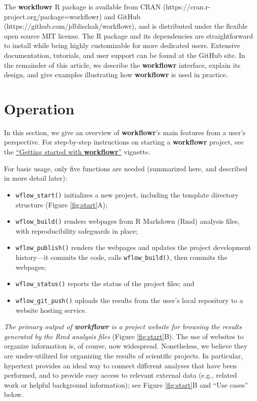 \documentclass[9pt,a4paper]{extarticle}
\begin{document}
The \textbf{workflowr} R package is available from CRAN
(https://cran.r-project.org/package=workflowr) and GitHub
(https://github.com/jdblischak/workflowr), and is distributed under the
flexible open source MIT license. The R package and its dependencies are
straightforward to install while being highly customizable for more
dedicated users. Extensive documentation, tutorials, and user support
can be found at the GitHub site. In the remainder of this article, we
describe the \textbf{workflowr} interface, explain its design, and give examples
illustrating how \textbf{workflowr} is used in practice.


\section*{Operation}

In this section, we give an overview of \textbf{workflowr}'s main features from a
user's perspective. For step-by-step instructions on starting a
 \textbf{workflowr} project, see the
\href{https://jdblischak.github.io/workflowr/articles/wflow-01-getting-started.html}{``Getting
started with \textbf{workflowr}''} vignette.

For basic usage, only five functions are needed (summarized here, and
described in more detail later):

\begin{itemize}

\item \texttt{wflow\_start()} initializes a new project, including the template
directory structure (Figure \ref{fig:start}A);

\item \texttt{wflow\_build()} renders webpages from R Markdown (Rmd) analysis
files, with reproducibility safeguards in place;

\item \texttt{wflow\_publish()} renders the webpages and updates the project
development history—it commits the code, calls \texttt{wflow\_build()}, then
commits the webpages;

\item \texttt{wflow\_status()} reports the status of the project files; and

\item \texttt{wflow\_git\_push()} uploads the results from the user's local
repository to a website hosting service.

\end{itemize}

\textit{The primary output of \textbf{workflowr} is a project website for
browsing the results generated by the Rmd analysis files} (Figure \ref{fig:start}B).
The use of websites to organize information is, of course, now
widespread. Nonetheless, we believe they are under-utilized for
organizing the results of scientific projects. In particular, hypertext
provides an ideal way to connect different analyses that have been
performed, and to provide easy access to relevant external data (e.g.,
related work or helpful background information); see Figure \ref{fig:start}B and ``Use
cases'' below.
\end{document}
